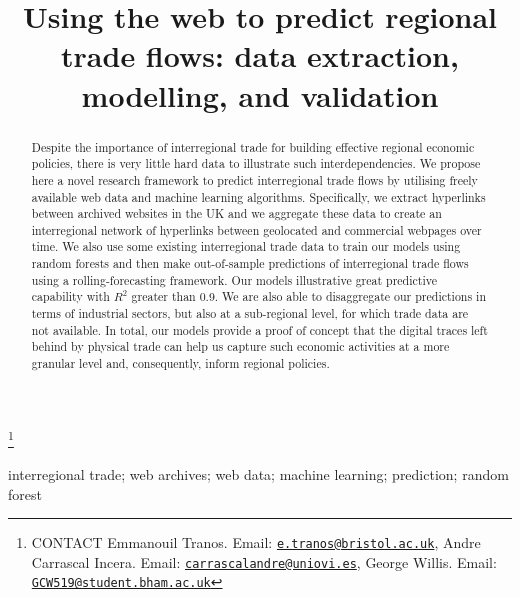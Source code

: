\documentclass[]{interact}
\theoremstyle{plain}%
\theoremstyle{definition}
\theoremstyle{remark}
\begin{document}
\articletype{}

\title{Using the web to predict regional trade flows: data extraction,
modelling, and validation}


\author{
}

\thanks{CONTACT Emmanouil
Tranos. Email: \href{mailto:e.tranos@bristol.ac.uk}{\nolinkurl{e.tranos@bristol.ac.uk}}, Andre
Carrascal
Incera. Email: \href{mailto:carrascalandre@uniovi.es}{\nolinkurl{carrascalandre@uniovi.es}}, George
Willis. Email: \href{mailto:GCW519@student.bham.ac.uk}{\nolinkurl{GCW519@student.bham.ac.uk}}}

\maketitle

\begin{abstract}
Despite the importance of interregional trade for building effective
regional economic policies, there is very little hard data to illustrate
such interdependencies. We propose here a novel research framework to
predict interregional trade flows by utilising freely available web data
and machine learning algorithms. Specifically, we extract hyperlinks
between archived websites in the UK and we aggregate these data to
create an interregional network of hyperlinks between geolocated and
commercial webpages over time. We also use some existing interregional
trade data to train our models using random forests and then make
out-of-sample predictions of interregional trade flows using a
rolling-forecasting framework. Our models illustrative great predictive
capability with \(R^2\) greater than 0.9. We are also able to
disaggregate our predictions in terms of industrial sectors, but also at
a sub-regional level, for which trade data are not available. In total,
our models provide a proof of concept that the digital traces left
behind by physical trade can help us capture such economic activities at
a more granular level and, consequently, inform regional policies.
\end{abstract}

\begin{keywords}
interregional trade; web archives; web data; machine learning;
prediction; random forest
\end{keywords}
\end{document}
